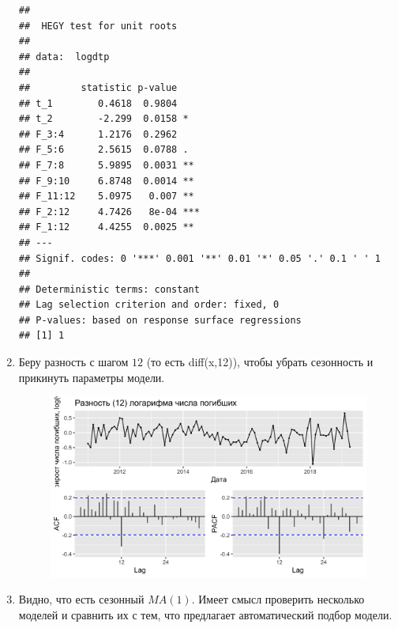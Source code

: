 \documentclass[14pt, a4paper]{extarticle}\usepackage[]{graphicx}\usepackage[]{color}
\makeatletter
\def\maxwidth{ %
  \ifdim\Gin@nat@width>\linewidth
    \linewidth
  \else
    \Gin@nat@width
  \fi
}
\newenvironment{kframe}{%
 \def\at@end@of@kframe{}%
 \ifinner\ifhmode%
  \def\at@end@of@kframe{\end{minipage}}%
  \begin{minipage}{\columnwidth}%
 \fi\fi%
 \def\FrameCommand##1{\hskip\@totalleftmargin \hskip-\fboxsep
 \colorbox{shadecolor}{##1}\hskip-\fboxsep
     \hskip-\linewidth \hskip-\@totalleftmargin \hskip\columnwidth}%
 \MakeFramed {\advance\hsize-\width
   \@totalleftmargin\z@ \linewidth\hsize
   \@setminipage}}%
 {\par\unskip\endMakeFramed%
 \at@end@of@kframe}
\newenvironment{knitrout}{}{} %
\makeatother
\begin{document}
\begin{enumerate}
\begin{knitrout}
\color{fgcolor}\begin{kframe}
\begin{verbatim}
## 
## 	HEGY test for unit roots
## 
## data:  logdtp
## 
##         statistic p-value    
## t_1        0.4618  0.9804    
## t_2        -2.299  0.0158 *  
## F_3:4      1.2176  0.2962    
## F_5:6      2.5615  0.0788 .  
## F_7:8      5.9895  0.0031 ** 
## F_9:10     6.8748  0.0014 ** 
## F_11:12    5.0975   0.007 ** 
## F_2:12     4.7426   8e-04 ***
## F_1:12     4.4255  0.0025 ** 
## ---
## Signif. codes: 0 '***' 0.001 '**' 0.01 '*' 0.05 '.' 0.1 ' ' 1 
## 
## Deterministic terms: constant 
## Lag selection criterion and order: fixed, 0
## P-values: based on response surface regressions
## [1] 1
\end{verbatim}
\end{kframe}
\end{knitrout}

\item Беру разность с шагом $12$ (то есть diff(x,12)), чтобы убрать сезонность и прикинуть параметры модели.

\begin{figure}[H]
\begin{knitrout}
\color{fgcolor}

{\centering \includegraphics[width=\maxwidth]{figure/unnamed-chunk-7-1} 

}



\end{knitrout}
\end{figure}

\item Видно, что есть сезонный $MA(1)$. Имеет смысл проверить несколько моделей и сравнить их с тем, что предлагает автоматический подбор модели. 


\end{enumerate}
\end{document}
